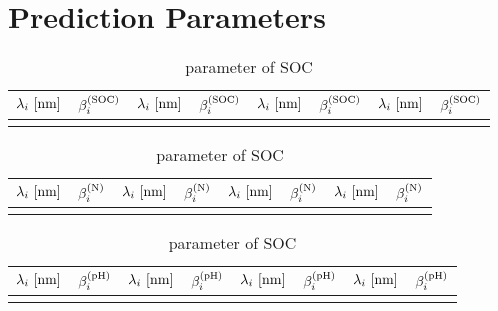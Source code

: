 \section{Prediction Parameters}
\label{sec:parameters}
	
	\begin{table}[ht]
		\center
		\caption{parameter of SOC}
		\setlength{\extrarowheight}{4pt}
		\begin{tabular}{rr|rr|rr|rr}
			\hline
			$\lambda_i \ [\m{nm}]$ & $\beta^{\mathrm{(SOC)}}_i$ & $\lambda_i \ [\m{nm}]$ & $\beta^{\mathrm{(SOC)}}_i$ & $\lambda_i \ [\m{nm}]$ & $\beta^{\mathrm{(SOC)}}_i$ & $\lambda_i \ [\m{nm}]$ & $\beta^{\mathrm{(SOC)}}_i$ \\
			\hline
			\hline
			
			\hline \\
		\end{tabular}
	\end{table}

	\begin{table}[H]
		\center
		\caption{parameter of SOC}
		\setlength{\extrarowheight}{2.2pt}
		\begin{tabular}{rr|rr|rr|rr}
			\hline
			$\lambda_i \ [\m{nm}]$ & $\beta^{\mathrm{(N)}}_i$ & $\lambda_i \ [\m{nm}]$ & $\beta^{\mathrm{(N)}}_i$ & $\lambda_i \ [\m{nm}]$ & $\beta^{\mathrm{(N)}}_i$ & $\lambda_i \ [\m{nm}]$ & $\beta^{\mathrm{(N)}}_i$ \\
			\hline
			\hline
			
			\hline \\
		\end{tabular}
	\end{table}

	\begin{table}[H]
		\center
		\caption{parameter of SOC}
		\setlength{\extrarowheight}{2.2pt}
		\begin{tabular}{rr|rr|rr|rr}
			\hline
			$\lambda_i \ [\m{nm}]$ & $\beta^{\mathrm{(pH)}}_i$ & $\lambda_i \ [\m{nm}]$ & $\beta^{\mathrm{(pH)}}_i$ & $\lambda_i \ [\m{nm}]$ & $\beta^{\mathrm{(pH)}}_i$ & $\lambda_i \ [\m{nm}]$ & $\beta^{\mathrm{(pH)}}_i$ \\
			\hline
			\hline
			
			\hline \\
		\end{tabular}
	\end{table}

